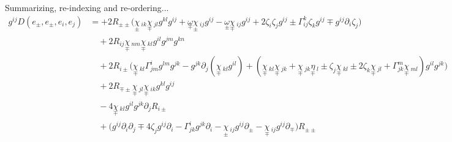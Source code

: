 \documentclass[a4paper,11pt]{article}
\numberwithin{equation}{section}
\theoremstyle{definition}
\begin{document}
Summarizing, re-indexing and re-ordering...
\begin{align*}
    \!\!\!\!\!\!\!\!\!\!\!\!\!\!\!\!\!\!\!\!
    g^{ij} D(e_\pm,e_\pm,e_i,e_j)
    &= 
    + 2 R_{\pm\pm} \Big( \underset{\pm}{\chi}\,_{ik} \underset{\mp}{\chi}\,_{jl}g^{kl}g^{ij}
    + \underset{\mp}{\omega} \underset{\pm}{\chi}\,_{ij}g^{ij}
    - \underset{\pm}{\omega} \underset{\mp}{\chi}\,_{ij}g^{ij}
    + 2 \zeta_i \zeta_jg^{ij}
    \pm \Gamma_{ij}^k \zeta_k g^{ij}
    \mp g^{ij} \partial_i\zeta_j \Big)\\
    &\quad 
    + 2 R_{ij} \underset{\mp}{\chi}\,_{nm} \underset{\mp}{\chi}\,_{kl}g^{il}g^{jm}g^{kn} \\
    &\quad 
    + 2 R_{i\pm} \Big( \underset{\mp}{\chi}\,_{kl}\Gamma_{jm}^i g^{lm} g^{jk}
    \!-\! g^{jk} \partial_j(\underset{\mp}{\chi}\,_{kl}g^{il})
    \!+\! (\underset{\mp}{\chi}\,_{kl} \underset{\mp}{\chi}\,_{jk}
    \!+\! \underset{\mp}{\chi}\,_{jk} \underset{\mp}{\eta}\,_l
    \!\pm\! \zeta_j \underset{\mp}{\chi}\,_{kl}
    \!\pm\! 2 \zeta_k \underset{\mp}{\chi}\,_{jl}
    \!+\! \Gamma_{jk}^m \underset{\mp}{\chi}\,_{ml} )g^{il} g^{jk}\Big) \\
    &\quad 
    + 2 R_{\mp\pm} \underset{\mp}{\chi}\,_{jl} \underset{\mp}{\chi}\,_{ik} g^{kl} g^{ij}\\
    &\quad 
    - 4 \underset{\mp}{\chi}\,_{kl}g^{il}  g^{jk} \partial_j R_{i \pm}\\
    &\quad 
    +  \Big( g^{ij}\partial_i \partial_j
    \mp 4 \zeta_j g^{ij}\partial_i
    -\Gamma_{jk}^i g^{jk}\partial_i
    -\underset{\pm}{\chi}\,_{ij} g^{ij} \partial_\pm
    -\underset{\mp}{\chi}\,_{ij} g^{ij} \partial_\mp \Big) R_{\pm\pm}
\end{align*}
\end{document}
